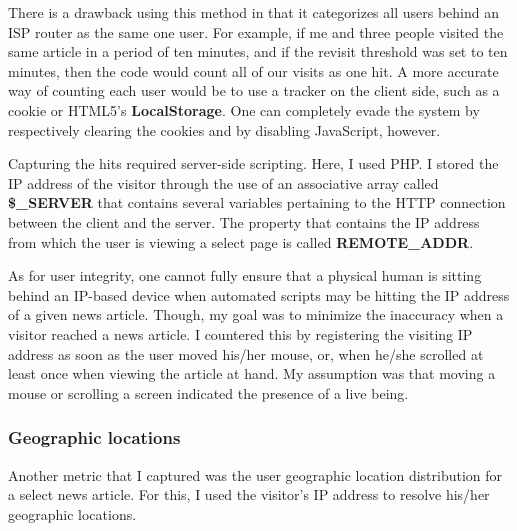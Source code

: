 \documentclass[12pt]{article}
\begin{document}
There is a drawback using this method in that it categorizes all users behind an ISP router as the same one user. For example, if me and three people visited the same article in a period of ten minutes, and if the revisit threshold was set to ten minutes, then the code would count all of our visits as one hit. A more accurate way of counting each user would be to use a tracker on the client side, such as a cookie or HTML5's \textbf{LocalStorage}. One can completely evade the system by respectively clearing the cookies and by disabling JavaScript, however. 

Capturing the hits required server-side scripting. Here, I used PHP. I stored the IP address of the visitor through the use of an associative array called \textbf{\$\_SERVER} that contains several variables pertaining to the HTTP connection between the client and the server. The property that contains the IP address from which the user is viewing a select page is called \textbf{REMOTE\_ADDR}. 

As for user integrity, one cannot fully ensure that a physical human is sitting behind an IP-based device when automated scripts may be hitting the IP address of a given news article. Though, my goal was to minimize the inaccuracy when a visitor reached a news article. I countered this by registering the visiting IP address as soon as the user moved his/her mouse, or, when he/she scrolled at least once when viewing the article at hand. My assumption was that moving a mouse or scrolling a screen indicated the presence of a live being. 

\newpage

\subsubsection{Geographic locations}
Another metric that I captured was the user geographic location distribution for a select news article. For this, I used the visitor's IP address to resolve his/her geographic locations.
\end{document}
